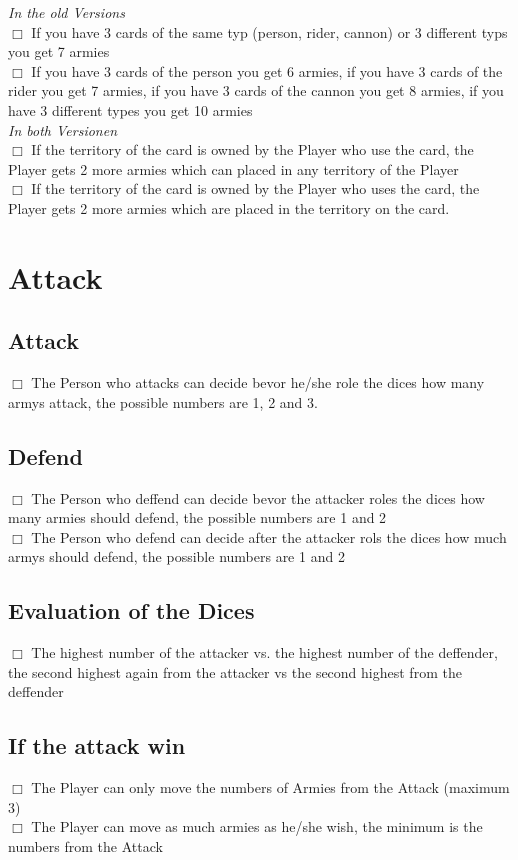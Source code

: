 \documentclass{article}
\begin{document}
\textit{In the old Versions}\\
$\Box$ If you have 3 cards of the same typ (person, rider, cannon) or 3 different typs you get 7 armies\\
$\Box$ If you have 3 cards of the person you get 6 armies, if you have 3 cards of the rider you get 7 armies, if you have 3 cards of the cannon you get 8 armies, if you have 3 different types you get 10 armies\\

\textit{In both Versionen}\\
$\Box$ If the territory of the card is owned by the Player who use the card, the Player gets 2 more armies which can placed in any territory of the Player\\
$\Box$ If the territory of the card is owned by the Player who uses the card, the Player gets 2 more armies which are placed in the territory on the card.

\section{Attack}

\subsection{Attack}
$\Box$ The Person who attacks can decide bevor he/she role the dices how many armys attack, the possible numbers are 1, 2 and 3.

\subsection{Defend}
$\Box$ The Person who deffend can decide bevor the attacker roles the dices how many armies should defend, the possible numbers are 1 and 2\\
$\Box$ The Person who defend can decide after the attacker rols the dices how much armys should defend, the possible numbers are 1 and 2

\subsection{Evaluation of the Dices}
$\Box$ The highest number of the attacker vs. the highest number of the deffender, the second highest again from the attacker vs the second highest from the deffender

\subsection{If the attack win}
$\Box$ The Player can only move the numbers of Armies from the Attack (maximum 3)\\
$\Box$ The Player can move as much armies as he/she wish, the minimum is the numbers from the Attack
\end{document}
